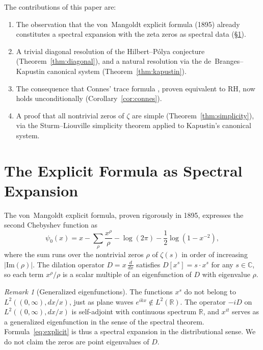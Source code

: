 \documentclass[11pt,a4paper]{amsart}
\theoremstyle{definition}
\theoremstyle{remark}
\newtheorem{remark}[theorem]{Remark}
\begin{document}
The contributions of this paper are:
\begin{enumerate}
\item[(i)] The observation that the von~Mangoldt explicit formula (1895) already constitutes a spectral expansion with the zeta zeros as spectral data (\S\ref{sec:explicit}).
\item[(ii)] A trivial diagonal resolution of the Hilbert--P\'olya conjecture (Theorem~\ref{thm:diagonal}), and a natural resolution via the de~Branges--Kapustin canonical system (Theorem~\ref{thm:kapustin}).
\item[(iii)] The consequence that Connes' trace formula \cite{Con99}, proven equivalent to RH, now holds unconditionally (Corollary~\ref{cor:connes}).
\item[(iv)] A proof that all nontrivial zeros of $\zeta$ are simple (Theorem~\ref{thm:simplicity}), via the Sturm--Liouville simplicity theorem applied to Kapustin's canonical system.
\end{enumerate}

\section{The Explicit Formula as Spectral Expansion}\label{sec:explicit}

The von~Mangoldt explicit formula, proven rigorously in 1895, expresses the second Chebyshev function as
\begin{equation}\label{eq:explicit}
\psi_0(x) = x - \sum_\rho \frac{x^\rho}{\rho} - \log(2\pi) - \frac{1}{2}\log(1 - x^{-2}),
\end{equation}
where the sum runs over the nontrivial zeros $\rho$ of $\zeta(s)$ in order of increasing $|\mathrm{Im}(\rho)|$. The dilation operator $D = x\,\tfrac{d}{dx}$ satisfies $D[x^s] = s\cdot x^s$ for any $s\in\mathbb{C}$, so each term $x^\rho/\rho$ is a scalar multiple of an eigenfunction of $D$ with eigenvalue $\rho$.

\begin{remark}[Generalized eigenfunctions]\label{rem:generalized}
The functions $x^s$ do not belong to $L^2((0,\infty), dx/x)$, just as plane waves $e^{ikx}\notin L^2(\mathbb{R})$. The operator $-iD$ on $L^2((0,\infty), dx/x)$ is self-adjoint with continuous spectrum $\mathbb{R}$, and $x^{it}$ serves as a generalized eigenfunction in the sense of the spectral theorem. Formula~\eqref{eq:explicit} is thus a spectral expansion in the distributional sense. We do not claim the zeros are point eigenvalues of $D$.
\end{remark}
\end{document}
